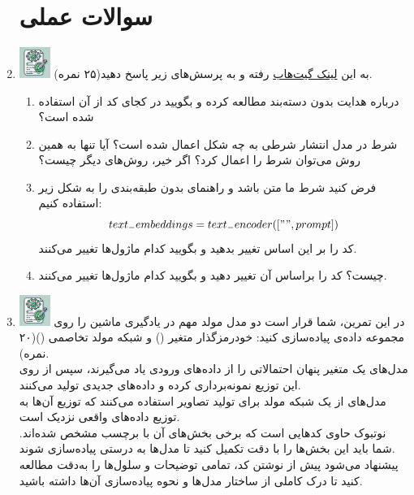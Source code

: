 \documentclass[12pt]{article}
\begin{document}
\begin{enumerate}
    \section*{سوالات عملی} 
    \item \includegraphics[width=1cm]{figs/Allowed_with_contributino.jpg}
    به این \href{https://github.com/dome272/Diffusion-Models-pytorch}{لینک گیت‌هاب} رفته و به پرسش‌های زیر پاسخ دهید(۲۵ نمره).
    \begin{enumerate}
        \item درباره هدایت بدون دسته‌بند مطالعه کرده و بگویید در کجای کد از آن استفاده شده است؟
        \item شرط در مدل انتشار شرطی به چه شکل اعمال شده است؟ آیا تنها به همین روش می‌توان شرط را اعمال کرد؟ اگر خیر، روش‌های دیگر چیست؟
        \item فرض کنید شرط ما متن باشد و راهنمای بدون طبقه‌بندی را به شکل زیر استفاده کنیم:
        $$
        text_{-}embeddings = text_{-}encoder(["", prompt])
        $$
        کد را بر این اساس تغییر بدهید و بگویید کدام ماژول‌ها تغییر می‌کنند.
        \item  {} چیست؟ کد را براساس آن تغییر دهید و بگویید کدام ماژول‌ها تغییر می‌کنند.

    \end{enumerate}




    
    \item \includegraphics[width=1cm]{figs/Allowed_with_contributino.jpg}
     در این تمرین، شما قرار است دو مدل مولد مهم در یادگیری ماشین را روی مجموعه داده‌ی  پیاده‌سازی کنید: خودرمزگذار متغیر () و شبکه مولد تخاصمی ()(۲۰ نمره).\\
    مدل‌های  یک متغیر پنهان احتمالاتی را از داده‌های ورودی یاد می‌گیرند، سپس از روی این توزیع نمونه‌برداری کرده و داده‌های جدیدی تولید می‌کنند.\\
    مدل‌های  از یک شبکه مولد برای تولید تصاویر استفاده می‌کنند که توزیع آن‌ها به توزیع داده‌های واقعی نزدیک است.\\
   نوتبوک  حاوی کدهایی است که برخی بخش‌های آن با برچسب  مشخص شده‌اند. شما باید این بخش‌ها را با دقت تکمیل کنید تا مدل‌ها به درستی پیاده‌سازی شوند.\\
    پیشنهاد می‌شود پیش از نوشتن کد، تمامی توضیحات و سلول‌ها را به‌دقت مطالعه کنید تا درک کاملی از ساختار مدل‌ها و نحوه پیاده‌سازی آن‌ها داشته باشید.


\end{enumerate}
\end{document}
